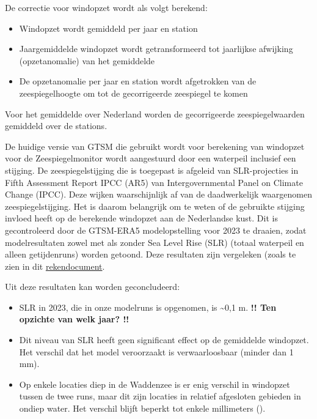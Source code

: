 \documentclass[ddraft]{deltares_report}
\begin{document}
De correctie voor windopzet wordt als volgt berekend:

\begin{itemize}
\item
  Windopzet wordt gemiddeld per jaar en station
\item
  Jaargemiddelde windopzet wordt getransformeerd tot jaarlijkse
  afwijking (opzetanomalie) van het gemiddelde
\item
  De opzetanomalie per jaar en station wordt afgetrokken van de
  zeespiegelhoogte om tot de gecorrigeerde zeespiegel te komen
\end{itemize}

Voor het gemiddelde over Nederland worden de gecorrigeerde
zeespiegelwaarden gemiddeld over de stations.

De huidige versie van GTSM die gebruikt wordt voor berekening van
windopzet voor de Zeespiegelmonitor wordt aangestuurd door een waterpeil
inclusief een stijging. De zeespiegelstijging die is toegepast is
afgeleid van SLR-projecties in Fifth Assessment Report IPCC (AR5) van
Intergovernmental Panel on Climate Change (IPCC). Deze wijken
waarschijnlijk af van de daadwerkelijk waargenomen zeespiegelstijging.
Het is daarom belangrijk om te weten of de gebruikte stijging invloed
heeft op de berekende windopzet aan de Nederlandse kust. Dit is
gecontroleerd door de GTSM-ERA5 modelopstelling voor 2023 te draaien,
zodat modelresultaten zowel met als zonder Sea Level Rise (SLR) (totaal
waterpeil en alleen getijdenruns) worden getoond. Deze resultaten zijn
vergeleken (zoals te zien in dit
\href{https://github.com/VU-IVM/gtsm3-era5-nrt/blob/main/02_analysis_and_validation/p06_compare_SLR_effect_surge_mean.ipynb}{rekendocument}.

Uit deze resultaten kan worden geconcludeerd:

\begin{itemize}
\tightlist
\item
  SLR in 2023, die in onze modelruns is opgenomen, is \textasciitilde0,1
  m. \textbf{!! Ten opzichte van welk jaar? !!}
\item
  Dit niveau van SLR heeft geen significant effect op de gemiddelde
  windopzet. Het verschil dat het model veroorzaakt is verwaarloosbaar
  (minder dan 1 mm).
\item
  Op enkele locaties diep in de Waddenzee is er enig verschil in
  windopzet tussen de twee runs, maar dit zijn locaties in relatief
  afgesloten gebieden in ondiep water. Het verschil blijft beperkt tot
  enkele millimeters ().
\end{itemize}
\end{document}

